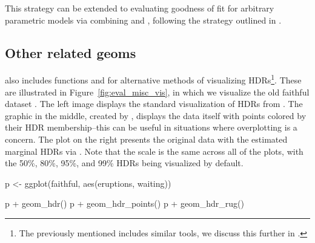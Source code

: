 This strategy can be extended to evaluating goodness of fit for arbitrary parametric models via combining  and ,
following the strategy outlined in .



\subsection{Other related geoms}\label{sec:other-geoms}


 also includes functions  and  for alternative methods of visualizing HDRs\footnote{
The previously mentioned  includes similar tools, we discuss this further in .
}.
These are illustrated in Figure~\ref{fig:eval_misc_vis}, in which we visualize the old faithful dataset \citep{azzalini_look_1990}.
The left image displays the standard visualization of HDRs from .
The graphic in the middle, created by , displays the data itself with points colored by their HDR membership--this
can be useful in situations where overplotting is a concern.
The plot on the right presents the original data with the estimated marginal HDRs via .
Note that the scale is the same across all of the plots, with the 50\%, 80\%, 95\%, and 99\% HDRs being visualized by default.

\begin{knitrout}
\color{fgcolor}\begin{kframe}
\begin{example}
p <- ggplot(faithful, aes(eruptions, waiting))

p + geom_hdr()
p + geom_hdr_points()
p + geom_hdr_rug()
\end{example}
\end{kframe}
\end{knitrout}

